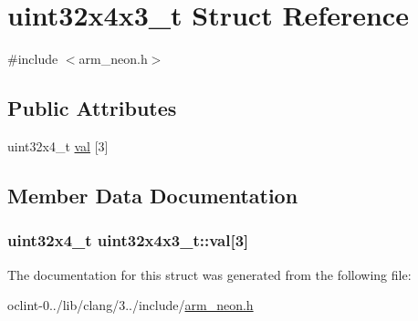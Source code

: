 \hypertarget{structuint32x4x3__t}{\section{uint32x4x3\-\_\-t Struct Reference}
\label{structuint32x4x3__t}
}


{\ttfamily \#include $<$arm\-\_\-neon.\-h$>$}

\subsection*{Public Attributes}
\begin{DoxyCompactItemize}
\item 
uint32x4\-\_\-t \hyperlink{structuint32x4x3__t_af3bdefffaa3d53304c061377f6693cd6}{val} \mbox{[}3\mbox{]}
\end{DoxyCompactItemize}


\subsection{Member Data Documentation}
\hypertarget{structuint32x4x3__t_af3bdefffaa3d53304c061377f6693cd6}{
\subsubsection[{val}]{\setlength{\rightskip}{0pt plus 5cm}uint32x4\-\_\-t uint32x4x3\-\_\-t\-::val\mbox{[}3\mbox{]}}}\label{structuint32x4x3__t_af3bdefffaa3d53304c061377f6693cd6}


The documentation for this struct was generated from the following file\-:\begin{DoxyCompactItemize}
\item 
oclint-\/0../lib/clang/3../include/\hyperlink{arm__neon_8h}{arm\-\_\-neon.\-h}\end{DoxyCompactItemize}
